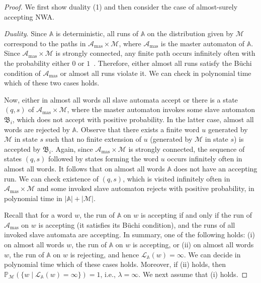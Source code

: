 \documentclass{lmcs}
\newcommand{\masterA}{\mathcal{A}_{\textrm{mas}}}
\newcommand{\nestedA}{\mathbb{A}}
\newcommand{\slaveA}{{\mathfrak{B}}}
\newcommand{\valueL}[1]{\mathcal{L}_{{#1}}}
\newcommand{\buchi}{B\"{u}chi}
\newcommand{\probability}{\mathbb{P}}
\newcommand{\markov}{\mathcal{M}}
\begin{document}
\begin{proof}
We first show duality (1) and then consider the case of almost-surely accepting NWA.\smallskip

\noindent\emph{Duality}.
Since $\nestedA$ is deterministic, all runs of $\nestedA$ on the distribution given by $\markov$ correspond to
the paths in $\masterA \times \markov$, where $\masterA$ is the master automaton of $\nestedA$.
Since $\masterA \times \markov$ is strongly connected, any finite path occurs infinitely often with the probability either $0$ or $1$~\cite{BaierBook}.
Therefore, either almost all runs satisfy the \buchi{} condition of $\masterA$ or almost all runs violate it.
We can check in polynomial time which of these two cases holds.

Now, either in almost all words all slave automata accept or
there is a state $(q,s)$ of $\masterA \times \markov$, where the master automaton invokes some slave automaton $\slaveA_i$,
which does not accept with positive probability. In the latter case, almost all words are rejected by $\nestedA$.
Observe that there exists a finite word $u$ generated by $\markov$ in state $s$ such that no finite extension of $u$ (generated by $\markov$ in state $s$) is accepted by $\slaveA_i$.
Again, since $\masterA \times \markov$ is strongly connected, the sequence of states $(q,s)$
followed by states forming the word $u$ occurs infinitely often in almost all words.
It follows that on almost all words $\nestedA$ does not have an accepting run.
We can check existence of $(q,s)$, which is visited infinitely often in $\masterA \times \markov$ and some invoked slave automaton rejects with positive probability, in polynomial time in $|\nestedA| + |\markov|$.

Recall that for a word $w$, the run of $\nestedA$ on $w$ is accepting if and only if
 the run of $\masterA$ on $w$ is accepting (it satisfies its \buchi{} condition), and
the runs of all invoked slave automata are accepting. In summary, one of the following holds:
(i) on almost all words $w$, the run of $\nestedA$ on $w$ is accepting, or
(ii) on almost all words $w$, the run of $\nestedA$ on $w$ is rejecting, and hence $\valueL{\nestedA}(w) = \infty$.
We can decide in polynomial time which of these cases holds. Moreover, if (ii) holds, then $\probability_{\markov}(\{ w \mid \valueL{\nestedA}(w) = \infty \}) = 1$, i.e., $\lambda = \infty$.
We next assume that (i) holds.
\smallskip


\end{proof}
\end{document}
